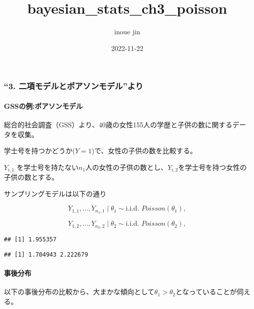 \documentclass[
]{article}
\title{bayesian\_stats\_ch3\_poisson}
\author{inoue jin}
\date{2022-11-22}
\begin{document}
\maketitle

\hypertarget{ux4e8cux9805ux30e2ux30c7ux30ebux3068ux30ddux30a2ux30bdux30f3ux30e2ux30c7ux30ebux3088ux308a}{%
\subsubsection{``3.
二項モデルとポアソンモデル''より}\label{ux4e8cux9805ux30e2ux30c7ux30ebux3068ux30ddux30a2ux30bdux30f3ux30e2ux30c7ux30ebux3088ux308a}}

\hypertarget{gssux306eux4f8bux30ddux30a2ux30bdux30f3ux30e2ux30c7ux30eb}{%
\paragraph{GSSの例:ポアソンモデル}\label{gssux306eux4f8bux30ddux30a2ux30bdux30f3ux30e2ux30c7ux30eb}}

総合的社会調査（GSS）より、40歳の女性155人の学歴と子供の数に関するデータを収集。

学士号を持つかどうか(\(Y=1\))で、女性の子供の数を比較する。

\(Y_{i,1}\)
を学士号を持たない\(n_{1}\)人の女性の子供の数とし、\(Y_{i,2}\)を学士号を持つ女性の子供の数とする。

サンプリングモデルは以下の通り

\[
Y_{1,1}, \dots,Y_{n_{1},1}\mid\theta_{1} \sim \text{i.i.d.} \,\,Poisson(\theta_{1}),
\]

\[
Y_{1,2}, \dots,Y_{n_{2},2}\mid\theta_{2} \sim \text{i.i.d.} \,\,Poisson(\theta_{2}),
\]

\begin{verbatim}
## [1] 1.955357
\end{verbatim}

\begin{verbatim}
## [1] 1.704943 2.222679
\end{verbatim}

\hypertarget{ux4e8bux5f8cux5206ux5e03}{%
\paragraph{事後分布}\label{ux4e8bux5f8cux5206ux5e03}}

以下の事後分布の比較から、大まかな傾向として\(\theta_{1} > \theta_{2}\)となっていることが伺える。
\end{document}
